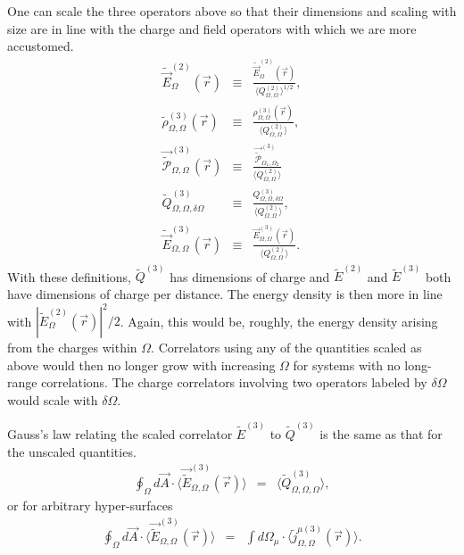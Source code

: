 \documentclass[aps, prc, 12pt, nofootinbib, showpacs, superscriptaddress, tightenlines, groupedaddress]{revtex4-2}
\begin{document}
One can scale the three operators above so that their dimensions and scaling with size are in line with the charge and field operators with which we are more accustomed.
\begin{eqnarray}
\tilde{\vec{E}}^{(2)}_{\Omega}(\vec{r})&\equiv&\frac{\tilde{\vec{E}}^{(2)}_{\Omega}(\vec{r})}{\langle Q^{(2)}_{\Omega,\Omega}\rangle^{1/2}},\\
\nonumber
\tilde{\rho}^{(3)}_{\Omega,\Omega}(\vec{r})&\equiv&\frac{\rho^{(3)}_{\Omega,\Omega}(\vec{r})}{\langle Q^{(2)}_{\Omega,\Omega}\rangle},\\
\nonumber
\vec{\tilde{\mathcal{P}}}_{\Omega,\Omega}^{(3)}(\vec{r})&\equiv&\frac{\vec{\tilde{\mathcal{P}}}_{\Omega_1,\Omega_2}^{(3)}}{\langle Q^{(2)}_{\Omega,\Omega}\rangle}\\
\nonumber
\tilde{Q}^{(3)}_{\Omega,\Omega,\delta\Omega}&\equiv&\frac{Q^{(3)}_{\Omega,\Omega,\delta\Omega}}{\langle Q^{(2)}_{\Omega,\Omega}\rangle},\\
\nonumber
\tilde{\vec{E}}^{(3)}_{\Omega,\Omega}(\vec{r})&\equiv&\frac{\vec{E}^{(3)}_{\Omega,\Omega}(\vec{r})}{\langle Q^{(2)}_{\Omega,\Omega}\rangle}.
\end{eqnarray}
With these definitions, $\tilde{Q}^{(3)}$ has dimensions of charge and $\tilde{E}^{(2)}$ and $\tilde{E}^{(3)}$ both have dimensions of charge per distance. The energy density is then more in line with $|\tilde{E}_{\Omega}^{(2)}(\vec{r})|^2/2$. Again, this would be, roughly, the energy density arising from the charges within $\Omega$. Correlators using any of the quantities scaled as above would then no longer grow with increasing $\Omega$ for systems with no long-range correlations. The charge correlators involving two operators labeled by $\delta\Omega$ would scale with $\delta\Omega$. 

Gauss's law relating  the scaled correlator $\tilde{E}^{(3)}$ to $\tilde{Q}^{(3)}$ is the same as that for the unscaled quantities.
\begin{eqnarray}
\oint_{\Omega} d\vec{A}\cdot\langle\vec{\tilde{E}}^{(3)}_{\Omega,\Omega}(\vec{r})\rangle&=&
\langle \tilde{Q}^{(3)}_{\Omega,\Omega,\Omega}\rangle,
\end{eqnarray}
or for arbitrary hyper-surfaces
\begin{eqnarray}\label{eq:gauss_scaled}
\oint_{\Omega} d\vec{A}\cdot\langle\vec{\tilde{E}}^{(3)}_{\Omega,\Omega}(\vec{r})\rangle&=&
\int d\Omega_{\mu}\cdot\langle \tilde{j}^{\mu(3)}_{\Omega,\Omega}(\vec{r})\rangle.
\end{eqnarray}
\end{document}
